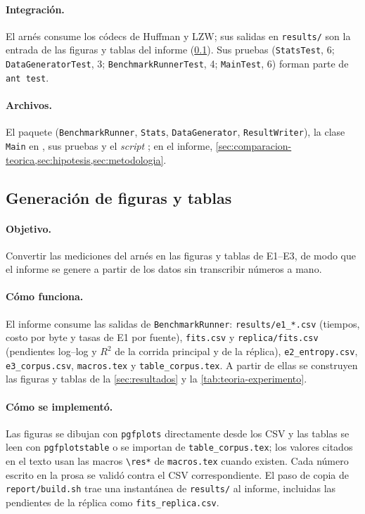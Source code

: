 \paragraph{Integración.} El arnés consume los códecs de Huffman y LZW; sus salidas en
\texttt{results/} son la entrada de las figuras y tablas del informe
(\cref{app:detalle-d}). Sus pruebas (\texttt{StatsTest}, 6; \texttt{DataGeneratorTest}, 3;
\texttt{BenchmarkRunnerTest}, 4; \texttt{MainTest}, 6) forman parte de \texttt{ant test}.

{\sloppy \paragraph{Archivos.} El paquete  (\texttt{BenchmarkRunner},
\texttt{Stats}, \texttt{DataGenerator}, \texttt{ResultWriter}), la clase \texttt{Main} en
, sus pruebas y el \emph{script}
; en el informe,
\cref{sec:comparacion-teorica,sec:hipotesis,sec:metodologia}.\par}

\subsection{Generación de figuras y tablas}
\label{app:detalle-d}
\paragraph{Objetivo.} Convertir las mediciones del arnés en las figuras y tablas de E1--E3, de
modo que el informe se genere a partir de los datos sin transcribir números a mano.

\paragraph{Cómo funciona.} El informe consume las salidas de \texttt{BenchmarkRunner}:
\texttt{results/e1\_*.csv} (tiempos, costo por byte y tasas de E1 por fuente),
\texttt{fits.csv} y \texttt{replica/fits.csv} (pendientes log--log y $R^2$ de la corrida
principal y de la réplica), \texttt{e2\_entropy.csv}, \texttt{e3\_corpus.csv},
\texttt{macros.tex} y \texttt{table\_corpus.tex}. A partir de ellas
se construyen las figuras y tablas de la \cref{sec:resultados} y la
\cref{tab:teoria-experimento}.

\paragraph{Cómo se implementó.} Las figuras se dibujan con \texttt{pgfplots} directamente desde
los CSV y las tablas se leen con \texttt{pgfplotstable} o se importan de
\texttt{table\_corpus.tex}; los valores citados en el texto usan las macros
\texttt{\textbackslash res*} de \texttt{macros.tex} cuando existen. Cada número escrito en la
prosa se validó contra el CSV correspondiente. El paso de copia de \texttt{report/build.sh} trae una instantánea de
\texttt{results/} al informe, incluidas las pendientes de la réplica como
\texttt{fits\_replica.csv}.

